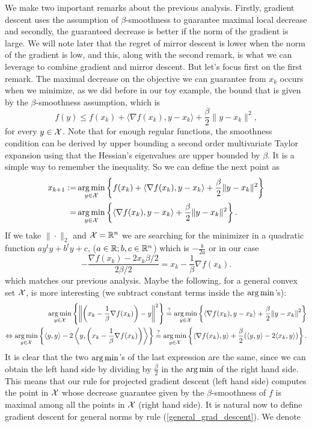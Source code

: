 We make two important remarks about the previous analysis. Firstly, gradient descent uses the assumption of $\beta$-smoothness to guarantee maximal local decrease and secondly, the guaranteed decrease is better if the norm of the gradient is large. We will note later that the regret of mirror descent is lower when the norm of the gradient is low, and this, along with the second remark, is what we can leverage to combine gradient and mirror descent. But let's focus first on the first remark. The maximal decrease on the objective we can guarantee from $x_k$ occurs when we minimize, as we did before in our toy example, the bound that is given by the $\beta$-smoothness assumption, which is
\[
    f(y) \leq f(x_k) + \langle \nabla f(x_k), y-x_k \rangle + \frac{\beta}{2} \|{y-x_k}\|^2,
\]
for every $y \in \mathcal{X}$. Note that for enough regular functions, the smoothness condition can be derived by upper bounding a second order multivariate Taylor expansion using that the Hessian's eigenvalues are upper bounded by $\beta$. It is a simple way to remember the inequality. So we can define the next point as
 \begin{align}\label{general_grad_descent}
     \begin{aligned}
     x_{k+1} := &\operatorname*{arg\,min}_{y \in \mathcal{X}} \left\{ f(x_k) + \langle \nabla f(x_k), y-x_k \rangle  +\frac{\beta}{2}\|{y-x_k}\|^2\right\} \\
    = &\operatorname*{arg\,min}_{y \in \mathcal{X}} \left\{ \langle \nabla f(x_k), y-x_k \rangle  +\frac{\beta}{2}\|{y-x_k}\|^2\right\}.
    \end{aligned}
\end{align}
If we take $\|{\cdot}\|_2$ and $\mathcal{X} = \mathbb{R}^n$ we are searching for the minimizer in a quadratic function $a y^t y + b^t y + c $, ($a \in \mathbb{R}; b, c \in \mathbb{R}^n$) which is $-\frac{b}{2a}$ or in our case
\[
    -\frac{\nabla f(x_k) - 2 x_k \beta/2}{2 \beta/2} = x_k - \frac{1}{\beta}\nabla f(x_k).
\]
which matches our previous analysis. Maybe the following, for a general convex set $\mathcal{X}$, is more interesting (we subtract constant terms inside the $\operatorname*{arg\,min}$'s):
\begin{align*}
    \operatorname*{arg\,min}_{y \in \mathcal{X}} \left\{ \left\|{\left(x_k - \frac{1}{\beta}\nabla f(x_k)\right) - y}\right\|^2 \right\} \stackrel{?}{=} \operatorname*{arg\,min}_{y \in \mathcal{X}} \left\{ \langle \nabla f(x_k), y-x_k \rangle  +\frac{\beta}{2}\|{y-x_k\|}^2\right\} \\
    \Leftrightarrow \operatorname*{arg\,min}_{y \in \mathcal{X}} \left\{ \langle y, y\rangle - 2\left\langle y, \left(x_k - \frac{1}{\beta} \nabla f(x_k)\right)\right\rangle\right\} \stackrel{?}{=} \operatorname*{arg\,min}_{y \in \mathcal{X}} \left\{ \langle \nabla f(x_k), y\rangle + \frac{\beta}{2}(\langle y, y\rangle - 2\langle x_k, y\rangle)\right\}. \\
\end{align*}
It is clear that the two $\operatorname*{arg\,min}$'s of the last expression are the same, since we can obtain the left hand side by dividing by $\frac{\beta}{2}$ in the $\operatorname*{arg\,min}$ of the right hand side. This means that our rule for projected gradient descent (left hand side) computes the point in $\mathcal{X}$ whose decrease guarantee given by the $\beta$-smoothness of $f$ is maximal among all the points in $\mathcal{X}$ (right hand side). It is natural now to define gradient descent for general norms by rule (\ref{general_grad_descent}). We denote 

